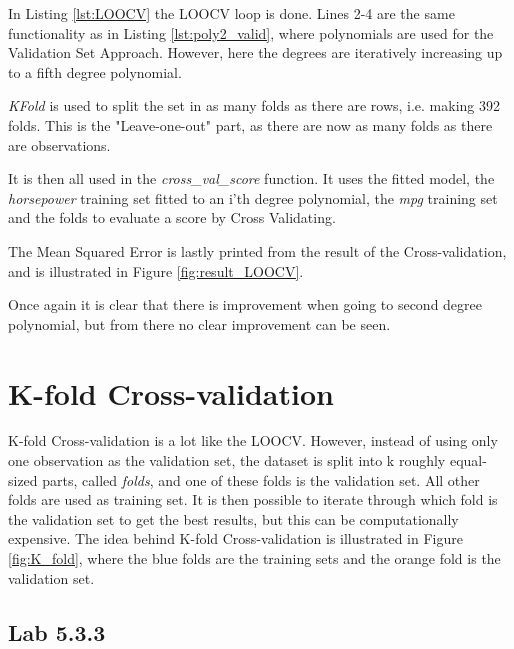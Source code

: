 In Listing \ref{lst:LOOCV} the LOOCV loop is done. Lines 2-4 are the same functionality as in Listing \ref{lst:poly2_valid}, where polynomials are used for the Validation Set Approach. However, here the degrees are iteratively increasing up to a fifth degree polynomial.

\emph{KFold} is used to split the set in as many folds as there are rows, i.e. making 392 folds. This is the "Leave-one-out" part, as there are now as many folds as there are observations. 

It is then all used in the \emph{cross\_val\_score} function. It uses the fitted model, the \emph{horsepower} training set fitted to an i'th degree polynomial, the \emph{mpg} training set and the folds to evaluate a score by Cross Validating.

The Mean Squared Error is lastly printed from the result of the Cross-validation, and is illustrated in Figure \ref{fig:result_LOOCV}.


Once again it is clear that there is improvement when going to second degree polynomial, but from there no clear improvement can be seen. 


\section{K-fold Cross-validation}
K-fold Cross-validation is a lot like the LOOCV. However, instead of using only one observation as the validation set, the dataset is split into k roughly equal-sized parts, called \emph{folds}, and one of these folds is the validation set. All other folds are used as training set. It is then possible to iterate through which fold is the validation set to get the best results, but this can be computationally expensive. The idea behind K-fold Cross-validation is illustrated in Figure \ref{fig:K_fold}, where the blue folds are the training sets and the orange fold is the validation set. 


\subsection{Lab 5.3.3}

